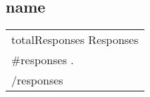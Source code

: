 \subsection{ {{{name}}} }
{
\begin{longtable}{p{\linewidth}}
	\multicolumn{1}{r}{ {{totalResponses}} Responses } \\
	{{#responses}}
	{{{.}}} \\
	{{/responses}}
\end{longtable}
}
\tagstructend